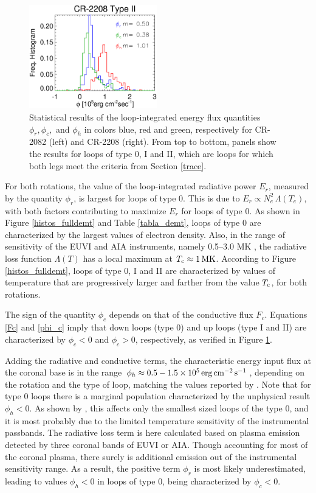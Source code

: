 \documentclass[namedreferences]{solarphysics}
\newcommand{\MK}{{\rm MK}}
\newcommand{\cm}{{\rm cm}}
\newcommand{\cminvs}{\cm^{-2}}
\newcommand{\erg}{{\rm erg}}
\newcommand{\s}{{\rm s}}
\newcommand{\Tc}{T_{\rm c}}
\begin{document}
\begin{article}
\begin{figure}[ht]
\begin{center}
\includegraphics[width=0.495\textwidth]{figs/histocr2208_cgenergia.eps}
\caption{{Statistical results of the loop-integrated energy flux quantities $\phi_r,\phi_c,$ and $\phi_h$ in colors blue, red and green, respectively for CR-2082 (left) and CR-2208 (right). From top to bottom, panels show the results for loops of type 0, I and II, which are loops for which both legs meet the criteria from Section \ref{trace}.}}
\label{energia_demt}
\end{center}
\end{figure} 

{For both rotations, the value of the {loop-integrated} radiative power $E_r$, measured by the quantity $\phi_r$, is largest for loops of type 0. This is due to $E_r\propto N_e^2\,\Lambda(T_e)$, with both factors contributing to maximize $E_r$ for loops of type 0. As shown in Figure \ref{histos_fulldemt} and Table \ref{tabla_demt}, loops of type 0 are characterized by {the largest} values of electron density. Also, in the range of sensitivity of the EUVI and AIA instruments, namely 0.5–3.0 MK \citep{nuevo_2015}, the radiative loss function $\Lambda(T)$ has a local maximum at $\Tc\approx 1\,\MK$. According to Figure \ref{histos_fulldemt}, loops of type 0, I and II are characterized by {values of temperature that are progressively larger and farther} from the value $\Tc$, for both rotations.}

{{The sign of the quantity $\phi_c$ depends on that of the conductive flux $F_c$. Equations \ref{Fc} and \ref{phi_c} imply that } down loops (type 0) and up loops (type I and II) are characterized by $\phi_c<0$ and $\phi_c>0$, respectively, {as verified} in Figure \ref{energia_demt}.}

{{Adding the} radiative and conductive terms, the characteristic energy input flux at the coronal base is in the range $\phi_h\approx 0.5-1.5 \times 10^5\,\erg\,\cminvs\,\s^{-1}$, depending on the rotation and the type of {loop, matching the values reported by} \citet{maccormack_2017}. Note that for type 0 loops there is a marginal population characterized by the unphysical result $\phi_h<0$. As shown by \citet{maccormack_2017}, {this affects only the smallest sized loops of the type 0}, and it is {most probably} due to the limited temperature sensitivity of the instrumental passbands. The radiative loss term is {here calculated based on plasma emission detected by three coronal bands of EUVI or AIA. Though accounting for most of the coronal plasma, there surely is additional emission out of the instrumental sensitivity range. As a result,} the positive term $\phi_r$ is most likely underestimated, leading to values $\phi_h<0$ in loops of type 0, {being characterized by $\phi_c<0$.}}


\end{article}
\end{document}
